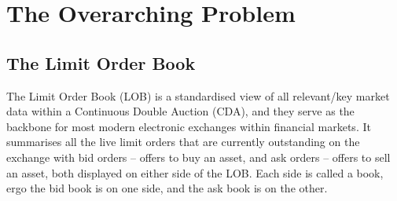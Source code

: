 \documentclass[ %
                    author={Ashwinder Khurana},
                supervisor={Prof Dave Cliff},
                    degree={MEng},
                     title={The Deeply Reinforced Trader},
                  subtitle={},
                      type={enterprise},
                      year={2020} ]{dissertation}
\begin{document}
\section{The Overarching Problem}
\vspace{0.5cm}
\subsection{The Limit Order Book}
\vspace{0.5cm}
The Limit Order Book (LOB) is a standardised view of all relevant/key market data within a Continuous Double Auction (CDA), and they serve as the backbone for most modern electronic exchanges within financial markets. It summarises all the live limit orders that are currently outstanding on the exchange with bid orders -- offers to buy an asset, and ask orders -- offers to sell an asset, both displayed on either side of the LOB. Each side is called a book, ergo the bid book is on one side, and the ask book is on the other. 
\end{document}
